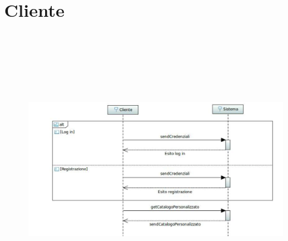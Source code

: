 \documentclass[a4paper,12pt]{report}
\begin{document}
	\section*{Cliente}
	\begin{figure}[h]
		\centering
		\includegraphics[width=\textwidth, height=12cm]{Sequence_Cliente}
	\end{figure}
	
	\newpage
\end{document}

